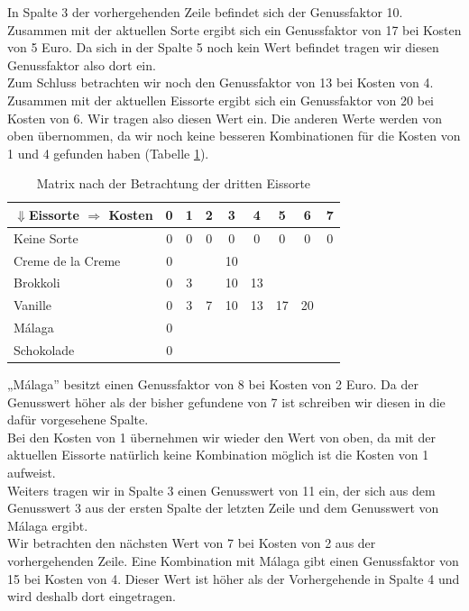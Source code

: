 \documentclass[a4paper, 12pt]{article}
\begin{document}
In Spalte 3 der vorhergehenden Zeile befindet sich der Genussfaktor 10.
Zusammen mit der aktuellen Sorte ergibt sich ein Genussfaktor von 17 bei
Kosten von 5 Euro. Da sich in der Spalte 5 noch kein Wert befindet tragen wir
diesen Genussfaktor also dort ein.\\

Zum Schluss betrachten wir noch den Genussfaktor von 13 bei Kosten von 4.
Zusammen mit der aktuellen Eissorte ergibt sich ein Genussfaktor von 20 bei
Kosten von 6. Wir tragen also diesen Wert ein. Die anderen Werte werden von
oben übernommen, da wir noch keine besseren Kombinationen für die Kosten von 1
und 4 gefunden haben (Tabelle \ref{table:3_Eis}).

\begin{table}[H]
	\begin{center}
		\begin{tabular}{l|cccccccc}
			$⇓$Eissorte $⇒$ Kosten & 0 & 1 & 2 & 3 & 4 & 5 &
			6 & 7\\
			\hline
			Keine Sorte			& 0 & 0 & 0 & 0	 &	0 &	 0 & 0 & 0	\\
			Creme de la Creme	& 0 &	&	& 10 &	  &	   &	&	\\
			Brokkoli			& 0 & 3 &	& 10 & 13 &	   &	&	\\
			Vanille				& 0 & 3 & 7 & 10 & 13 & 17 & 20 &	\\
			Málaga				& 0 &	&	&	 &	  &	   &	&	\\
			Schokolade			& 0 &	&	&	 &	  &	   &	&	\\
		\end{tabular}
	\end{center}
\caption{Matrix nach der Betrachtung der dritten Eissorte}
\label{table:3_Eis}
\end{table}

„Málaga” besitzt einen Genussfaktor von 8 bei Kosten von 2 Euro. Da der
Genusswert höher als der bisher gefundene von 7 ist schreiben wir diesen in
die dafür vorgesehene Spalte.\\

Bei den Kosten von 1 übernehmen wir wieder den Wert von oben, da mit der
aktuellen Eissorte natürlich keine Kombination möglich ist die Kosten von 1
aufweist.\\

Weiters tragen wir in Spalte 3 einen Genusswert von 11 ein, der sich aus dem
Genusswert 3 aus der ersten Spalte der letzten Zeile und dem Genusswert von
Málaga ergibt.\\

Wir betrachten den nächsten Wert von 7 bei Kosten von 2 aus der vorhergehenden
Zeile. Eine Kombination mit Málaga gibt einen Genussfaktor von 15 bei Kosten
von 4. Dieser Wert ist höher als der Vorhergehende in Spalte 4 und wird
deshalb dort eingetragen.\\
\end{document}
